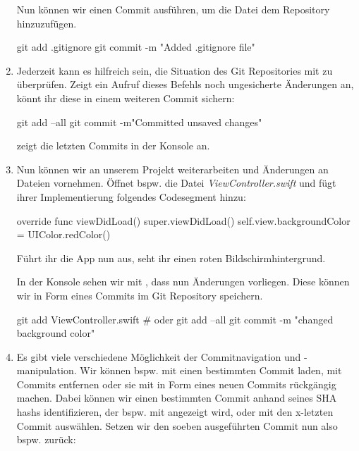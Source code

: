 \documentclass[parskip=half, final]{scrreprt}
\begin{document}
\begin{lecture}
\begin{enumerate}
Nun können wir einen Commit ausführen, um die Datei dem Repository hinzuzufügen.

\begin{shcode}
git add .gitignore
git commit -m "Added .gitignore file"
\end{shcode}

\item Jederzeit kann es hilfreich sein, die Situation des Git Repositories mit  zu überprüfen. Zeigt ein Aufruf dieses Befehls noch ungesicherte Änderungen an, könnt ihr diese in einem weiteren Commit sichern:

\begin{shcode}
git add --all
git commit -m"Committed unsaved changes"
\end{shcode}

 zeigt die letzten Commits in der Konsole an.

\item Nun können wir an unserem Projekt weiterarbeiten und Änderungen an Dateien vornehmen. Öffnet bspw. die Datei \emph{ViewController.swift} und fügt ihrer Implementierung folgendes Codesegment hinzu:

\begin{swiftcode}
override func viewDidLoad() {
    super.viewDidLoad()
    self.view.backgroundColor = UIColor.redColor()
}
\end{swiftcode}

Führt ihr die App nun aus, seht ihr einen roten Bildschirmhintergrund.

In der Konsole sehen wir mit , dass nun Änderungen vorliegen. Diese können wir in Form eines Commits im Git Repository speichern.

\begin{shcode}
git add ViewController.swift # oder git add --all
git commit -m "changed background color"
\end{shcode}

\item Es gibt viele verschiedene Möglichkeit der Commitnavigation und -manipulation. Wir können bspw. mit  einen bestimmten Commit laden, mit  Commits entfernen oder sie mit  in Form eines neuen Commits rückgängig machen. Dabei können wir einen bestimmten Commit anhand seines SHA hashs identifizieren, der bspw. mit  angezeigt wird, oder mit  den x-letzten Commit auswählen. Setzen wir den soeben ausgeführten Commit nun also bspw. zurück:


\end{enumerate}
\end{lecture}
\end{document}
